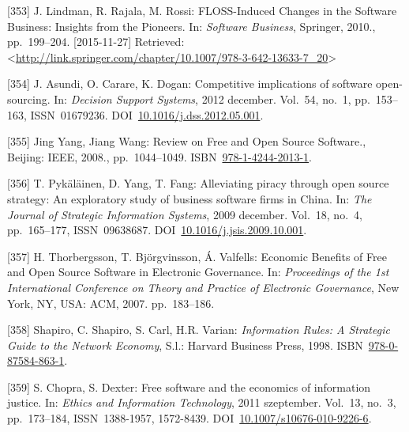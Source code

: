 \documentclass[12pt,magyar,a4paper,oneside]{scrreprt}
\newenvironment{cslreferences}%
  {}%
  {\par}
\begin{document}
\begin{cslreferences}
\leavevmode\hypertarget{ref-lindman_floss-induced_2010}{}%
{[}353{]} J. Lindman, R. Rajala, M. Rossi: FLOSS-Induced Changes in the
Software Business: Insights from the Pioneers. In: \emph{Software
Business}, Springer, 2010., pp.~199--204. {[}2015-11-27{]} Retrieved:
\textless{}\url{http://link.springer.com/chapter/10.1007/978-3-642-13633-7_20}\textgreater{}

\leavevmode\hypertarget{ref-asundi_competitive_2012}{}%
{[}354{]} J. Asundi, O. Carare, K. Dogan: Competitive implications of
software open-sourcing. In: \emph{Decision Support Systems}, 2012
december. Vol.~54, no.~1, pp.~153--163, ISSN~01679236.
DOI~\href{https://doi.org/10.1016/j.dss.2012.05.001}{10.1016/j.dss.2012.05.001}.

\leavevmode\hypertarget{ref-jing_yang_review_2008}{}%
{[}355{]} Jing Yang, Jiang Wang: Review on Free and Open Source
Software., Beijing: IEEE, 2008., pp.~1044--1049.
ISBN~\href{https://worldcat.org/isbn/978-1-4244-2013-1}{978-1-4244-2013-1}.

\leavevmode\hypertarget{ref-pykalainen_alleviating_2009}{}%
{[}356{]} T. Pykäläinen, D. Yang, T. Fang: Alleviating piracy through
open source strategy: An exploratory study of business software firms in
China. In: \emph{The Journal of Strategic Information Systems}, 2009
december. Vol.~18, no.~4, pp.~165--177, ISSN~09638687.
DOI~\href{https://doi.org/10.1016/j.jsis.2009.10.001}{10.1016/j.jsis.2009.10.001}.

\leavevmode\hypertarget{ref-thorbergsson_economic_2007}{}%
{[}357{]} H. Thorbergsson, T. Björgvinsson, Á. Valfells: Economic
Benefits of Free and Open Source Software in Electronic Governance. In:
\emph{Proceedings of the 1st International Conference on Theory and
Practice of Electronic Governance}, New York, NY, USA: ACM, 2007.
pp.~183--186.

\leavevmode\hypertarget{ref-shapiro_information_1998}{}%
{[}358{]} Shapiro, C. Shapiro, S. Carl, H.R. Varian: \emph{Information
Rules: A Strategic Guide to the Network Economy}, S.l.: Harvard Business
Press, 1998.
ISBN~\href{https://worldcat.org/isbn/978-0-87584-863-1}{978-0-87584-863-1}.

\leavevmode\hypertarget{ref-chopra_free_2011}{}%
{[}359{]} S. Chopra, S. Dexter: Free software and the economics of
information justice. In: \emph{Ethics and Information Technology}, 2011
szeptember. Vol.~13, no.~3, pp.~173--184, ISSN~1388-1957, 1572-8439.
DOI~\href{https://doi.org/10.1007/s10676-010-9226-6}{10.1007/s10676-010-9226-6}.


\end{cslreferences}
\end{document}
